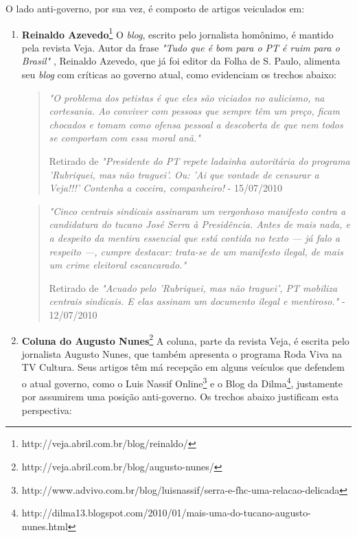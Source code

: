 O lado anti-governo, por sua vez, é composto de artigos veiculados em:

\begin{enumerate}

\item \textbf{Reinaldo Azevedo}\footnote{http://veja.abril.com.br/blog/reinaldo/} O \emph{blog}, escrito pelo jornalista homônimo, é mantido pela revista Veja. Autor da frase \emph{"Tudo que é bom para o PT é ruim para o Brasil"} \cite{bom-pt-mau-brasil}, Reinaldo Azevedo, que já foi editor da Folha de S. Paulo, alimenta seu \emph{blog} com críticas ao governo atual, como evidenciam os trechos abaixo:

\begin{quote}

\emph{"O problema dos petistas é que eles são viciados no aulicismo, na cortesania. Ao conviver com pessoas que sempre têm um preço, ficam chocados e tomam como ofensa pessoal a descoberta de que nem todos se comportam com essa moral anã."}

{\small Retirado de \emph{"Presidente do PT repete ladainha autoritária do programa 'Rubriquei, mas não traguei'. Ou: 'Ai que vontade de censurar a Veja!!!' Contenha a coceira, companheiro!} - 15/07/2010} 
\end{quote}

\begin{quote}

\emph{"Cinco centrais sindicais assinaram um vergonhoso manifesto contra a candidatura do tucano José Serra à Presidência. Antes de mais nada, e a despeito da mentira essencial que está contida no texto — já falo a respeito —, cumpre destacar: trata-se de um manifesto ilegal, de mais um crime eleitoral escancarado."}

{\small Retirado de \emph{"Acuado pelo 'Rubriquei, mas não traguei', PT mobiliza centrais sindicais. E elas assinam um documento ilegal e mentiroso."} - 12/07/2010 }

\end{quote}

\item \textbf{Coluna do Augusto Nunes}\footnote{http://veja.abril.com.br/blog/augusto-nunes/} A coluna, parte da revista Veja, é escrita pelo jornalista Augusto Nunes, que também apresenta o programa Roda Viva na TV Cultura. Seus artigos têm má recepção em alguns veículos que defendem o atual governo, como o Luis Nassif Online\footnote{http://www.advivo.com.br/blog/luisnassif/serra-e-fhc-uma-relacao-delicada} e o Blog da Dilma\footnote{http://dilma13.blogspot.com/2010/01/mais-uma-do-tucano-augusto-nunes.html}, justamente por assumirem uma posição anti-governo. Os trechos abaixo justificam esta perspectiva:



\end{enumerate}
